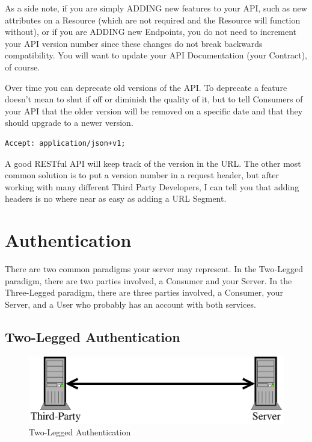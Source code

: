 \documentclass{book}
\begin{document}
As a side note, if you are simply ADDING new features to your API, such as new attributes on a Resource (which are not required and the Resource will function without), or if you are ADDING new Endpoints, you do not need to increment your API version number since these changes do not break backwards compatibility. You will want to update your API Documentation (your Contract), of course.

Over time you can deprecate old versions of the API. To deprecate a feature doesn't mean to shut if off or diminish the quality of it, but to tell Consumers of your API that the older version will be removed on a specific date and that they should upgrade to a newer version.

\begin{verbatim}
Accept: application/json+v1;
\end{verbatim}

A good RESTful API will keep track of the version in the URL. The other most common solution is to put a version number in a request header, but after working with many different Third Party Developers, I can tell you that adding headers is no where near as easy as adding a URL Segment.


\section{Authentication}

There are two common paradigms your server may represent. In the Two-Legged paradigm, there are two parties involved, a Consumer and your Server. In the Three-Legged paradigm, there are three parties involved, a Consumer, your Server, and a User who probably has an account with both services.

\subsection{Two-Legged Authentication}

\begin{figure}[!htb]
\centering
\includegraphics[scale=.6]{images/two-legged.eps}
\caption{Two-Legged Authentication}
\label{fig:twolegged}
\end{figure}
\end{document}
